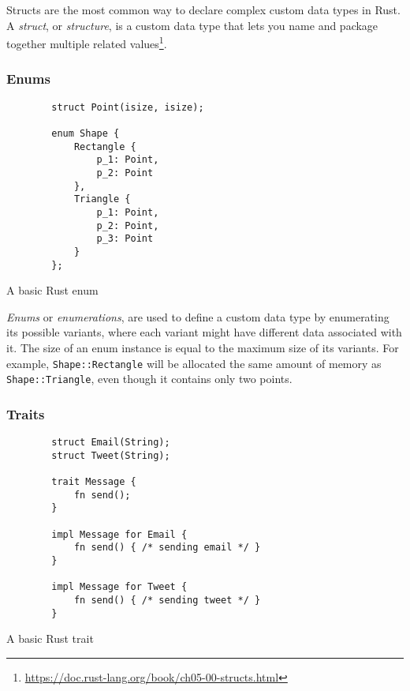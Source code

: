 Structs are the most common way to declare complex custom data types in Rust. A \emph{struct}, or \emph{structure}, is a custom data type that lets you name and package together multiple related values\footnote{\url{https://doc.rust-lang.org/book/ch05-00-structs.html}}.

\subsubsection*{Enums}

\begin{listing}[!htbp]

    \centering
    \begin{verbatim}
        struct Point(isize, isize);

        enum Shape {
            Rectangle {
                p_1: Point,
                p_2: Point
            },
            Triangle {
                p_1: Point,
                p_2: Point,
                p_3: Point
            }
        };
    \end{verbatim}

    \caption{A basic Rust enum}
    \label{lst:enum}
\end{listing}

\emph{Enums} or \emph{enumerations}, are used to define a custom data type by enumerating its possible variants, where each variant might have different data associated with it. The size of an enum instance is equal to the maximum size of its variants. For example, \texttt{Shape::Rectangle} will be allocated the same amount of memory as \texttt{Shape::Triangle}, even though it contains only two points.

\subsubsection*{Traits}

\begin{listing}[!htbp]

    \centering
    \begin{verbatim}
        struct Email(String);
        struct Tweet(String);

        trait Message {
            fn send();
        }

        impl Message for Email {
            fn send() { /* sending email */ }
        }

        impl Message for Tweet {
            fn send() { /* sending tweet */ }
        }
    \end{verbatim}

    \caption{A basic Rust trait}
    \label{lst:trait}
\end{listing}

